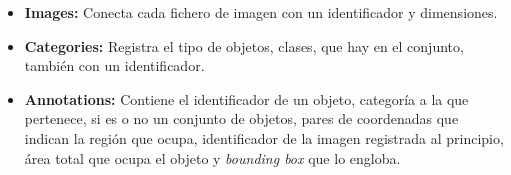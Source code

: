 \begin{itemize}
    \item \textbf{Images:} Conecta cada fichero de imagen con un identificador y dimensiones.
    \item \textbf{Categories:} Registra el tipo de objetos, clases, que hay en el conjunto, también con un identificador.
    \item \textbf{Annotations:} Contiene el identificador de un objeto, categoría a la que pertenece, si es o no un conjunto de objetos, pares de coordenadas que indican la región que ocupa, identificador de la imagen registrada al principio, área total que ocupa el objeto y \emph{bounding box} que lo engloba.
    
\end{itemize}

